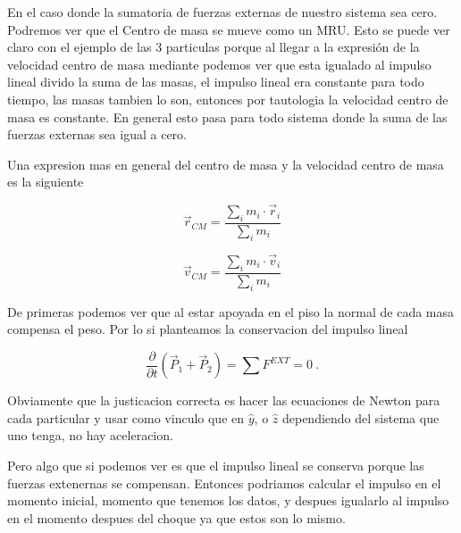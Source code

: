 \documentclass[../Main.tex]{subfiles}
\begin{document}
{

    En el caso donde la sumatoria de fuerzas externas de nuestro sistema sea cero.
    Podremos ver que el Centro de masa se mueve como un MRU. Esto se puede ver
    claro con el ejemplo de las 3 particulas porque al llegar a la expresión de
    la velocidad centro de masa mediante podemos ver que esta igualado al impulso
    lineal divido la suma de las masas, el impulso lineal era constante para todo
    tiempo, las masas tambien lo son, entonces por tautologia la velocidad centro
    de masa es constante. En general esto pasa para todo sistema donde la suma
    de las fuerzas externas sea igual a cero.

    Una expresion mas en general del centro de masa y la velocidad centro de masa
    es la siguiente

    \begin{equation*}
        \vec{r} _{CM} = \frac{\sum _i m_i \cdot \vec{r} _i}{\sum _i m_i}
    \end{equation*}

    \begin{equation*}
        \vec{v} _{CM} = \frac{\sum _i m_i \cdot \vec{v} _i}{\sum _i m_i}
    \end{equation*}


    De primeras podemos ver que al estar apoyada en el piso la normal de cada
    masa compensa el peso. Por lo si planteamos la conservacion del impulso
    lineal

    \begin{equation*}
        \frac{\partial}{\partial t} \left( \vec{P} _1 + \vec{P} _2 \right) = \sum F^{EXT} = 0 \ .
    \end{equation*}

    Obviamente que la justicacion correcta es hacer las ecuaciones de Newton para 
    cada particular y usar como vinculo que en $\hat{y}$, o $\hat{z}$ dependiendo
    del sistema que uno tenga, no hay aceleracion.

    Pero algo que si podemos ver es que el impulso lineal se conserva porque las
    fuerzas extenernas se compensan. Entonces podriamos calcular el impulso en el
    momento inicial, momento que tenemos los datos, y despues igualarlo al impulso
    en el momento despues del choque ya que estos son lo mismo.

}
\end{document}
